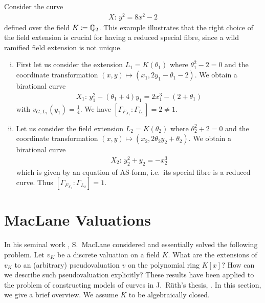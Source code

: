 \begin{example}
    Consider the curve
    \begin{align}
        X: \, y^2 = 8x^2 - 2
    \end{align}
    defined over the field $K \coloneqq \mathbb Q_2$.
    This example illustrates that the right choice of the field extension is crucial for having a reduced special fibre,
    since a wild ramified field extension is not unique.
    \begin{enumerate}[(i)]
        \item First let us consider the extension $L_1 = K(\theta_1)$ where $\theta_1^2 - 2 = 0$ and the coordinate transformation
            $(x,y) \mapsto (x_1, 2y_1 - \theta_1 - 2)$.
            We obtain a birational curve
            \begin{align}
                X_1: \, y_1^2 - (\theta_1 + 4)y_1 = 2x_1^3 - (2 + \theta_1)
            \end{align}
            with $v_{{\scriptscriptstyle G}, L_1}(y_1) = \frac{1}{4}$.
            We have $[\Gamma_{F_{X_1}}: \Gamma_{L_1}] = 2 \neq 1$.
        \item Let us consider the field extension $L_2 = K(\theta_2)$ where $\theta_2^2 + 2 = 0$
            and the coordinate transformation $(x,y) \mapsto (x_2, 2\theta_2 y_2 + \theta_2)$.
            We obtain a birational curve
            \begin{align}
                X_2: \, y_2^2 + y_2 = -x_2^3
            \end{align}
            which is given by an equation of AS-form, i.e.\ its special fibre is a reduced curve.
            Thus $[\Gamma_{F_{X_2}}: \Gamma_{L_2}] = 1$.
    \end{enumerate}
\end{example}


\section{MacLane Valuations}

In his seminal work \cite{MacLane}, S.~MacLane considered and essentially solved the following problem.
Let $v_K$ be a discrete valuation on a field $K$.
What are the extensions of $v_K$ to an (arbitrary) pseudovaluation $v$ on the polynomial ring $K[x]$?
How can we describe such pseudovaluation explicitly?
These results have been applied to the problem of constructing models of curves in J.~Rüth's thesis, \cite{Rueth}. 
In this section, we give a brief overview.
We assume $K$ to be algebraically closed.


